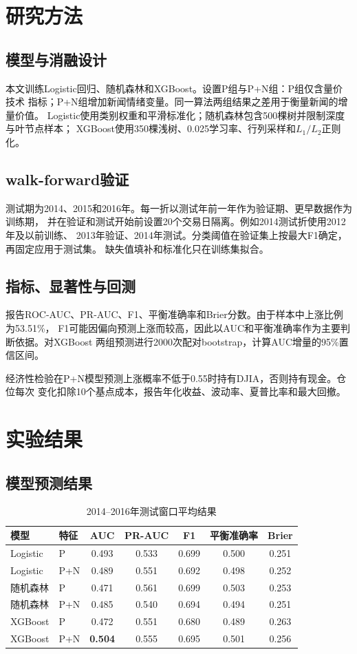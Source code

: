 \documentclass[UTF8,a4paper,9.5pt,fontset=none]{ctexart}
\begin{document}
\section{研究方法}
\subsection{模型与消融设计}
本文训练Logistic回归、随机森林和XGBoost。设置P组与P+N组：P组仅含量价技术
指标；P+N组增加新闻情绪变量。同一算法两组结果之差用于衡量新闻的增量价值。
Logistic使用类别权重和平滑标准化；随机森林包含500棵树并限制深度与叶节点样本；
XGBoost使用350棵浅树、0.025学习率、行列采样和$L_1/L_2$正则化。

\subsection{walk-forward验证}
测试期为2014、2015和2016年。每一折以测试年前一年作为验证期、更早数据作为训练期，
并在验证和测试开始前设置20个交易日隔离。例如2014测试折使用2012年及以前训练、
2013年验证、2014年测试。分类阈值在验证集上按最大F1确定，再固定应用于测试集。
缺失值填补和标准化只在训练集拟合。

\subsection{指标、显著性与回测}
报告ROC-AUC、PR-AUC、F1、平衡准确率和Brier分数。由于样本中上涨比例为53.51\%，
F1可能因偏向预测上涨而较高，因此以AUC和平衡准确率作为主要判断依据。对XGBoost
两组预测进行2000次配对bootstrap，计算AUC增量的95\%置信区间。

经济性检验在P+N模型预测上涨概率不低于0.55时持有DJIA，否则持有现金。仓位每次
变化扣除10个基点成本，报告年化收益、波动率、夏普比率和最大回撤。

\section{实验结果}
\subsection{模型预测结果}
\begin{table}[H]
\centering\small
\caption{2014--2016年测试窗口平均结果}
\begin{tabular}{llccccc}
\toprule
模型 & 特征 & AUC & PR-AUC & F1 & 平衡准确率 & Brier\\
\midrule
Logistic & P & 0.493 & 0.533 & 0.699 & 0.500 & 0.251\\
Logistic & P+N & 0.489 & 0.551 & 0.692 & 0.498 & 0.252\\
随机森林 & P & 0.471 & 0.561 & 0.699 & 0.503 & 0.253\\
随机森林 & P+N & 0.485 & 0.540 & 0.694 & 0.494 & 0.251\\
XGBoost & P & 0.472 & 0.551 & 0.680 & 0.489 & 0.263\\
XGBoost & P+N & \textbf{0.504} & 0.555 & 0.695 & 0.501 & 0.256\\
\bottomrule
\end{tabular}
\label{tab:model-results}
\end{table}
\end{document}
